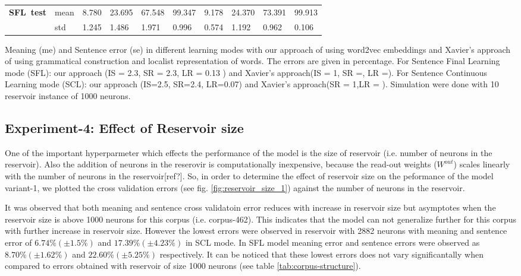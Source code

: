 \begin{table}
\begin{threeparttable}
\begin{tabular}{llllllllll}
  \textbf{SFL\ test}	& mean  & 8.780 & 23.695 	& 67.548 & 99.347 	& 9.178 & 24.370 	& 73.391 & 99.913 \\
  			  			& std 	& 1.245 & 1.486		& 1.971  & 0.996  	& 0.574 & 1.192 	& 0.962  & 0.106  \\
  \bottomrule
\end{tabular}
\begin{tablenotes}
\small
\item 
Meaning (me) and Sentence error (se) in different learning modes with our approach of using word2vec embeddings and Xavier's \cite{xavier:2013:RT} approach of using grammatical construction and localist representation of words. The errors are given in percentage. For Sentence Final Learning mode (SFL): our approach (IS = 2.3, SR = 2.3, LR = 0.13 ) and Xavier's approach(IS = 1, SR =, LR =). For Sentence Continuous Learning mode (SCL): our approach (IS=2.5, SR=2.4, LR=0.07) and Xavier's approach(SR = 1,LR = ). Simulation were done with 10 reservoir instance of 1000 neurons.
\end{tablenotes}
\end{threeparttable}
\end{table}

\subsection{Experiment-4: Effect of Reservoir size}

One of the important hyperparmeter which effects the performance of the model is the size of reservoir (i.e. number of neurons in the reservoir). Also the addition of neurons in the reserovir is computationally inexpensive, because the read-out weights ($W^{out}$) scales linearly with the number of neurons in the reservoir[ref?]. So, in order to determine the effect of reservoir size on the peformance of the model variant-1, we plotted the cross validation errors (see fig. \ref{fig:reservoir_size_1}) against the number of neurons in the reservoir. 

It was observed that both meaning and sentence cross validatoin error reduces with increase in reservoir size but asymptotes when the reservoir size is above 1000 neurons for this corpus (i.e. corpus-462). This indicates that the model can not generalize further for this corpus with further increase in reservoir size. However the lowest errors were observed in reservoir with 2882 neurons with meaning and sentence error of $6.74 \% (\pm 1.5\%)$ and $17.39\% (\pm 4.23 \%)$ in SCL mode. In SFL model meaning error and sentence errors were observed as $8.70 \% (\pm 1.62\%)$ and $22.60\% (\pm 5.25 \%)$ respectively. It can be noticed that these lowest errors does not vary significantally when compared to errors obtained with reservoir of size 1000 neurons (see table \ref{tab:corpus-structure}).

